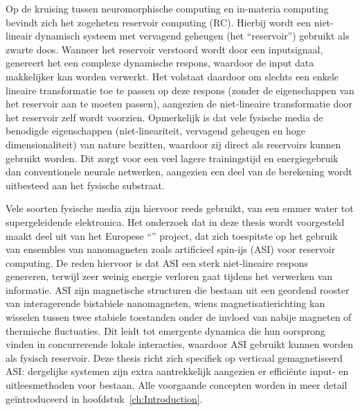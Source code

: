 Op de kruising tussen neuromorphische computing en in-materia computing bevindt zich het zogeheten reservoir computing (RC).
Hierbij wordt een niet-lineair dynamisch systeem met vervagend geheugen (het ``reservoir'') gebruikt als zwarte doos.
Wanneer het reservoir verstoord wordt door een inputsignaal, genereert het een complexe dynamische respons, waardoor de input data makkelijker kan worden verwerkt.
Het volstaat daardoor om slechts een enkele lineaire transformatie toe te passen op deze respons (zonder de eigenschappen van het reservoir aan te moeten passen), aangezien de niet-lineaire transformatie door het reservoir zelf wordt voorzien. 
Opmerkelijk is dat vele fysische media de benodigde eigenschappen (niet-lineariteit, vervagend geheugen en hoge dimensionaliteit) van nature bezitten, waardoor zij direct als reservoirs kunnen gebruikt worden.
Dit zorgt voor een veel lagere trainingstijd en energiegebruik dan conventionele neurale netwerken, aangezien een deel van de berekening wordt uitbesteed aan het fysische substraat. \par
Vele soorten fysische media zijn hiervoor reeds gebruikt, van een emmer water tot supergeleidende elektronica.
Het onderzoek dat in deze thesis wordt voorgesteld maakt deel uit van het Europese ``\spinengine'' project, dat zich toespitste op het gebruik van ensembles van nanomagneten zoals artificieel spin-ijs (ASI) voor reservoir computing.
De reden hiervoor is dat ASI een sterk niet-lineaire respons genereren, terwijl zeer weinig energie verloren gaat tijdens het verwerken van informatie.
ASI zijn magnetische structuren die bestaan uit een geordend rooster van interagerende bistabiele nanomagneten, wiens magnetisatierichting kan wisselen tussen twee stabiele toestanden onder de invloed van nabije magneten of thermische fluctuaties.
Dit leidt tot emergente dynamica die hun oorsprong vinden in concurrerende lokale interacties, waardoor ASI gebruikt kunnen worden als fysisch reservoir.
Deze thesis richt zich specifiek op verticaal gemagnetiseerd ASI: dergelijke systemen zijn extra aantrekkelijk aangezien er effici\"ente input- en uitleesmethoden voor bestaan.
Alle voorgaande concepten worden in meer detail ge\"introduceerd in hoofdstuk~\ref{ch:Introduction}. \\

